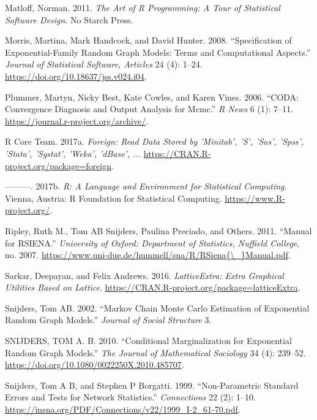 \documentclass[]{book}
\begin{document}
\leavevmode\hypertarget{ref-Matloff2011}{}%
Matloff, Norman. 2011. \emph{The Art of R Programming: A Tour of Statistical Software Design}. No Starch Press.

\leavevmode\hypertarget{ref-Morris2008}{}%
Morris, Martina, Mark Handcock, and David Hunter. 2008. ``Specification of Exponential-Family Random Graph Models: Terms and Computational Aspects.'' \emph{Journal of Statistical Software, Articles} 24 (4): 1--24. \url{https://doi.org/10.18637/jss.v024.i04}.

\leavevmode\hypertarget{ref-R-coda}{}%
Plummer, Martyn, Nicky Best, Kate Cowles, and Karen Vines. 2006. ``CODA: Convergence Diagnosis and Output Analysis for Mcmc.'' \emph{R News} 6 (1): 7--11. \url{https://journal.r-project.org/archive/}.

\leavevmode\hypertarget{ref-R-foreign}{}%
R Core Team. 2017a. \emph{Foreign: Read Data Stored by 'Minitab', 'S', 'Sas', 'Spss', 'Stata', 'Systat', 'Weka', 'dBase', ...} \url{https://CRAN.R-project.org/package=foreign}.

\leavevmode\hypertarget{ref-R}{}%
---------. 2017b. \emph{R: A Language and Environment for Statistical Computing}. Vienna, Austria: R Foundation for Statistical Computing. \url{https://www.R-project.org/}.

\leavevmode\hypertarget{ref-Ripley2011}{}%
Ripley, Ruth M., Tom AB Snijders, Paulina Preciado, and Others. 2011. ``Manual for RSIENA.'' \emph{University of Oxford: Department of Statistics, Nuffield College}, no. 2007. \href{https://www.uni-due.de/hummell/sna/R/RSiena\%7B/_\%7DManual.pdf}{https://www.uni-due.de/hummell/sna/R/RSiena\{\textbackslash{}\_\}Manual.pdf}.

\leavevmode\hypertarget{ref-R-latticeExtra}{}%
Sarkar, Deepayan, and Felix Andrews. 2016. \emph{LatticeExtra: Extra Graphical Utilities Based on Lattice}. \url{https://CRAN.R-project.org/package=latticeExtra}.

\leavevmode\hypertarget{ref-Snijders2002}{}%
Snijders, Tom AB. 2002. ``Markov Chain Monte Carlo Estimation of Exponential Random Graph Models.'' \emph{Journal of Social Structure} 3.

\leavevmode\hypertarget{ref-Snijders2010margin}{}%
SNIJDERS, TOM A. B. 2010. ``Conditional Marginalization for Exponential Random Graph Models.'' \emph{The Journal of Mathematical Sociology} 34 (4): 239--52. \url{https://doi.org/10.1080/0022250X.2010.485707}.

\leavevmode\hypertarget{ref-Snijders1999}{}%
Snijders, Tom A B, and Stephen P Borgatti. 1999. ``Non-Parametric Standard Errors and Tests for Network Statistics.'' \emph{Connections} 22 (2): 1--10. \url{https://insna.org/PDF/Connections/v22/1999_I-2_61-70.pdf}.
\end{document}
